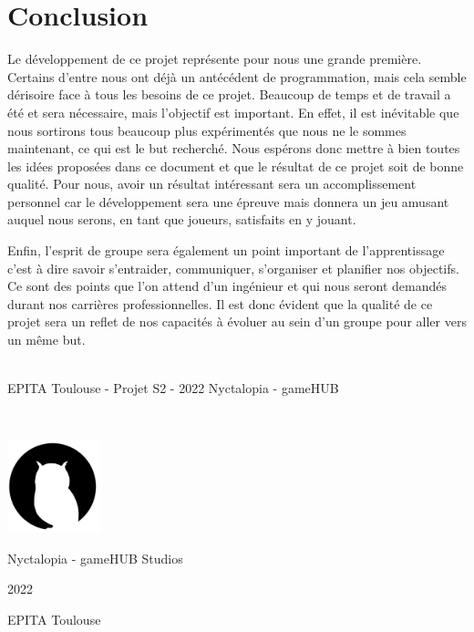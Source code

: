 \section{Conclusion}

Le développement de ce projet représente pour nous une grande première.
Certains d’entre nous ont déjà un antécédent de programmation, mais cela
semble dérisoire face à tous les besoins de ce projet. Beaucoup de temps et de
travail a été et sera nécessaire, mais l’objectif est important. En effet, il est inévitable
que nous sortirons tous beaucoup plus expérimentés que nous ne le sommes maintenant, ce qui est le but recherché. Nous espérons donc mettre à bien toutes les
idées proposées dans ce document et que le résultat de ce projet soit de bonne
qualité. Pour nous, avoir un résultat intéressant sera un accomplissement personnel car le développement sera une épreuve mais donnera un jeu amusant
auquel nous serons, en tant que joueurs, satisfaits en y jouant.

Enfin, l'esprit de groupe sera également un point important de l'apprentissage c'est à dire savoir s'entraider, communiquer, s'organiser et planifier nos objectifs. Ce sont des points que l'on attend d'un ingénieur et qui nous seront demandés durant nos carrières professionnelles. Il est donc évident que la qualité de ce projet sera un reflet de nos capacités à évoluer au sein d'un groupe pour aller vers un même but.

\vfill
\noindent\makebox[\linewidth]{\rule{.8\paperwidth}{.6pt}}\\[0.2cm]
EPITA Toulouse - Projet S2 - 2022 \hfill Nyctalopia - gameHUB
\noindent\makebox[\linewidth]{\rule{.8\paperwidth}{.6pt}}

\newpage

\thispagestyle{empty}
~
\vfill
\begin{center}
\includegraphics[width=0.2\textwidth]{img/logos/logo.png}

\large Nyctalopia - gameHUB Studios

\large 2022

\large EPITA Toulouse
\end{center}